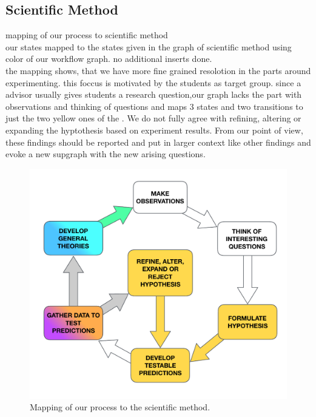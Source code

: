 
\subsection {Scientific Method}
\label{subsec:scientific method}

mapping of our process to scientific method\\
our states mapped to the states given in the graph of scientific method using color of our workflow graph. no additional inserts done.\\
the mapping shows, that we have more fine grained resolotion in the parts around experimenting. this foccus is motivated by the students as target group.
since a advisor usually gives students a research question,our graph lacks the part with observations and thinking of questions and maps 3 states and two transitions to just the two yellow ones of the \checklist.
We do not fully agree with refining, altering or expanding the hyptothesis based on experiment results. From our point of view, these findings should be reported and put in larger context like other findings and evoke a new supgraph with the new arising questions.


\begin{figure}
	\centering
	\includegraphics[width=12cm]{figures/scientific_method_mapping.pdf}
	\caption{Mapping of our process to the scientific method. }
	\label{fig:PICOT_FINER}
\end{figure}


